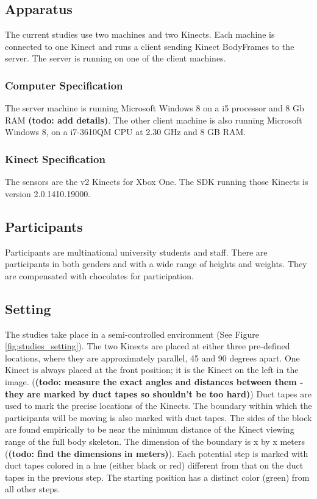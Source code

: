 \documentclass{sigchi}
\begin{document}
\subsection{Apparatus}

The current studies use two machines and two Kinects. Each machine is connected to one Kinect and runs a client sending Kinect BodyFrames to the server. The server is running on one of the client machines.

\subsubsection{Computer Specification}

The server machine is running Microsoft Windows 8 on a i5 processor and 8 Gb RAM \textbf{(todo: add details)}. The other client machine is also running Microsoft Windows 8, on a i7-3610QM CPU at 2.30 GHz and 8 GB RAM.

\subsubsection{Kinect Specification}

The sensors are the v2 Kinects for Xbox One. The SDK running those Kinects is version 2.0.1410.19000.

\subsection{Participants}

Participants are multinational university students and staff. There are participants in both genders and with a wide range of heights and weights. They are compensated with chocolates for participation.

\subsection{Setting}

The studies take place in a semi-controlled environment (See Figure \ref{fig:studies_setting}). The two Kinects are placed at either three pre-defined locations, where they are approximately parallel, 45 and 90 degrees apart. One Kinect is always placed at the front position; it is the Kinect on the left in the image. (\textbf{(todo: measure the exact angles and distances between them - they are marked by duct tapes so shouldn't be too hard)}) Duct tapes are used to mark the precise locations of the Kinects. The boundary within which the participants will be moving is also marked with duct tapes. The sides of the block are found empirically to be near the minimum distance of the Kinect viewing range of the full body skeleton. The dimension of the boundary is x by x meters (\textbf{(todo: find the dimensions in meters)}). Each potential step is marked with duct tapes colored in a hue (either black or red) different from that on the duct tapes in the previous step. The starting position has a distinct color (green) from all other steps.
\end{document}
